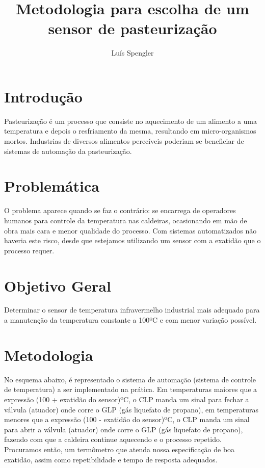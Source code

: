 \documentclass{article}
\title{Metodologia para escolha de um sensor de pasteurização}
\date{}
\author[1]{Luís Spengler}
\affil[1]{Instituto Federal de Educação, Ciência e Tecnologia de Mato Grosso do Sul}
\begin{document}
\maketitle

\tableofcontents

\section{Introdução}
Pasteurização é um processo que consiste no aquecimento de um alimento a uma temperatura e depois o resfriamento da mesma, resultando em micro-organismos mortos. Industrias de diversos alimentos perecíveis poderiam se beneficiar de sistemas de automação da pasteurização.

\section{Problemática}
O problema aparece quando se faz o contrário: se encarrega de operadores humanos para controle da temperatura nas caldeiras, ocasionando em mão de obra mais cara e menor qualidade do processo. Com sistemas automatizados não haveria este risco, desde que estejamos utilizando um sensor com a exatidão que o processo requer.

\section{Objetivo Geral}
Determinar o sensor de temperatura infravermelho industrial mais adequado para a manutenção da temperatura constante a 100ºC e com menor variação possível.

\section{Metodologia}
No esquema abaixo, é representado o sistema de automação (sistema de controle de temperatura) a ser implementado na prática. Em temperaturas maiores que a expressão (100 + exatidão do sensor)ºC, o CLP manda um sinal para fechar a válvula (atuador) onde corre o GLP (gás liquefato de propano), em temperaturas menores que a expressão (100 - exatidão do sensor)ºC, o CLP manda um sinal para abrir a válvula (atuador) onde corre o GLP (gás liquefato de propano), fazendo com que a caldeira continue aquecendo e o processo repetido.
Procuramos então, um termômetro que atenda nossa especificação de boa exatidão, assim como repetibilidade e tempo de resposta adequados.
\end{document}
